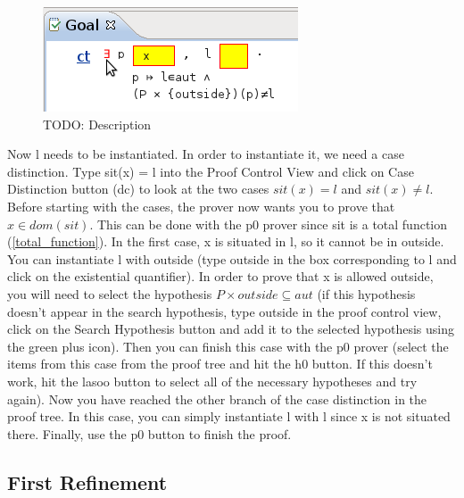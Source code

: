 \begin{figure}[!h]
\begin{center}
	\includegraphics{img/tutorial/tut_10_instantiate_p.png}
	\caption{TODO: Description}
	\label{fig_tut_10_instantiate_p}
\end{center}
\end{figure}


Now \textsf{l} needs to be instantiated. In order to instantiate it, we need a case distinction. Type sit(x) = l into the \textsf{Proof Control View} and click on \textsf{Case Distinction button (dc)} to look at the two cases $sit(x) = l$ and $sit(x) \neq l$. Before starting with the cases, the prover now wants you to prove that $x \in dom(sit)$. This can be done with the \textsf{p0} prover since \textsf{sit} is a total function (\ref{total_function}). In the first case, \textsf{x} is situated in \textsf{l}, so it cannot be in \textsf{outside}. You can instantiate \textsf{l} with \textsf{outside} (type \textsf{outside} in the box corresponding to \textsf{l} and click on the existential quantifier). In order to prove that \textsf{x} is allowed \textsf{outside}, you will need to select the hypothesis $P \times {outside} \subseteq aut$ (if this hypothesis doesn't appear in the search hypothesis, type outside in the proof control view, click on the \textsf{Search Hypothesis button} and add it to the selected hypothesis using the green plus icon). Then you can finish this case with the \textsf{p0} prover (select the items from this case from the proof tree and hit the h0 button. If this doesn't work, hit the lasoo button to select all of the necessary hypotheses and try again). Now you have reached the other branch of the case distinction in the proof tree. In this case, you can simply instantiate \textsf{l} with \textsf{l} since 
\textsf{x} is not situated there. Finally, use the \textsf{p0} button to finish the proof. 

\subsection{First Refinement}

